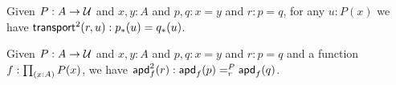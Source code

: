 \documentclass[hott-all.tex]{subfiles}
\begin{document}
% 
% 
\begin{lem}
  Given $P:A\to\type$ and $x,y:A$ and $p,q:x=y$ and $r:p=q$, for any $u:P(x)$ we have $\transtwo r u : \trans p u = \trans q u$.
\end{lem}
% 
% 
\begin{lem}
  Given $P:A\to\type$ and $x,y:A$ and $p,q:x=y$ and $r:p=q$ and a function $f:\prd{x:A} P(x)$, we have
  $\apdtwo f r : \dpath P r {\apd f p}{\apd f q}$.
\end{lem}
% 
% 
% 
% 
\end{document}
